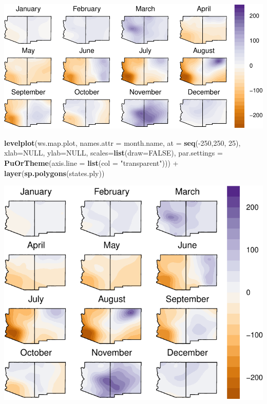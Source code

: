 \documentclass[]{article}
\newenvironment{Shaded}{\begin{snugshade}}{\end{snugshade}}
\newcommand{\KeywordTok}[1]{\textcolor[rgb]{0.13,0.29,0.53}{\textbf{{#1}}}}
\newcommand{\DataTypeTok}[1]{\textcolor[rgb]{0.13,0.29,0.53}{{#1}}}
\newcommand{\DecValTok}[1]{\textcolor[rgb]{0.00,0.00,0.81}{{#1}}}
\newcommand{\StringTok}[1]{\textcolor[rgb]{0.31,0.60,0.02}{{#1}}}
\newcommand{\OtherTok}[1]{\textcolor[rgb]{0.56,0.35,0.01}{{#1}}}
\newcommand{\NormalTok}[1]{{#1}}
\begin{document}
\includegraphics{extra-figures_files/figure-latex/water_stress-1.pdf}

\begin{Shaded}
\begin{Highlighting}[]
\KeywordTok{levelplot}\NormalTok{(ws.map.plot, }\DataTypeTok{names.attr =} \NormalTok{month.name, }\DataTypeTok{at =} \KeywordTok{seq}\NormalTok{(-}\DecValTok{250}\NormalTok{,}\DecValTok{250}\NormalTok{, }\DecValTok{25}\NormalTok{), }\DataTypeTok{xlab=}\OtherTok{NULL}\NormalTok{, }\DataTypeTok{ylab=}\OtherTok{NULL}\NormalTok{, }\DataTypeTok{scales=}\KeywordTok{list}\NormalTok{(}\DataTypeTok{draw=}\OtherTok{FALSE}\NormalTok{), }\DataTypeTok{par.settings =} \KeywordTok{PuOrTheme}\NormalTok{(}\DataTypeTok{axis.line =} \KeywordTok{list}\NormalTok{(}\DataTypeTok{col =} \StringTok{"transparent"}\NormalTok{))) +}
\StringTok{  }\KeywordTok{layer}\NormalTok{(}\KeywordTok{sp.polygons}\NormalTok{(states.ply))}
\end{Highlighting}
\end{Shaded}

\includegraphics{extra-figures_files/figure-latex/water_stress-2.pdf}
\end{document}
